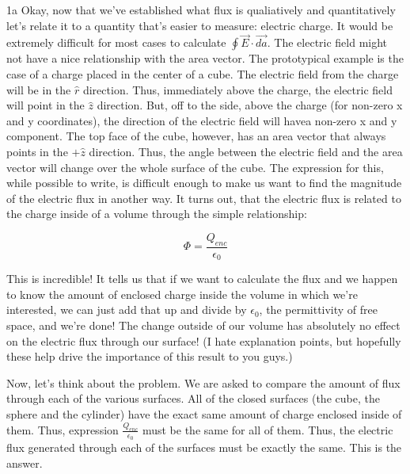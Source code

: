 \begin{homeworkProblem}[Quiz 3, Pr. 1]
\begin{homeworkSection}{1a}
        Okay, now that we've established what flux is qualiatively and
        quantitatively let's relate it to a quantity that's easier to
        measure: electric charge. It would be extremely difficult for
        most cases to calculate $\oint \vec{E}\cdot \vec{da}$. The
        electric field might not have a nice relationship with the area
        vector. The prototypical example is the case of a charge placed
        in the center of a cube. The electric field from the charge will
        be in the $\hat{r}$ direction. Thus, immediately above the
        charge, the electric field will point in the $\hat{z}$
        direction. But, off to the side, above the charge (for non-zero
        x and y coordinates), the direction of the electric field will
        havea non-zero x and y component. The top face of the cube,
        however, has an area vector that always points in the $+\hat{z}$
        direction. Thus, the angle between the electric field and the
        area vector will change over the whole surface of the cube. The
        expression for this, while possible to write, is difficult
        enough to make us want to find the magnitude of the electric
        flux in another way. It turns out, that the electric flux is
        related to the charge inside of a volume through the simple
        relationship:

        \[
        \Phi = \frac{Q_{enc}}{\epsilon_0}
        \]

        This is incredible! It tells us that if we want to calculate the
        flux and we happen to know the amount of enclosed charge inside
        the volume in which we're interested, we can just add that up
        and divide by $\epsilon_0$, the permittivity of free space, and
        we're done! The change outside of our volume has absolutely no
        effect on the electric flux through our surface! (I hate
        explanation points, but hopefully these help drive the
        importance of this result to you guys.)

        Now, let's think about the problem. We are asked to compare the
        amount of flux through each of the various surfaces. All of the
        closed surfaces (the cube, the sphere and the cylinder) have the
        exact same amount of charge enclosed inside of them. Thus,
        expression $\frac{Q_{enc}}{\epsilon_0}$ must be the same for all
        of them. Thus, the electric flux generated through each of the
        surfaces must be exactly the same. This is the answer.

    \end{homeworkSection}


\end{homeworkProblem}
